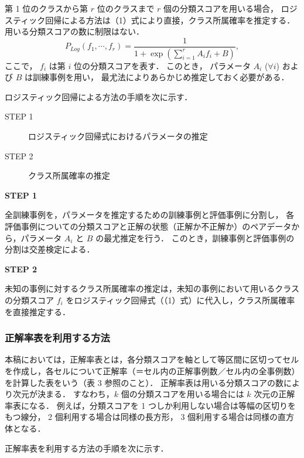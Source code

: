 \documentclass[japanese]{jnlp_1.4}
\begin{document}
第 1 位のクラスから第 $r$ 位のクラスまで $r$ 個の分類スコアを用いる場合，
ロジスティック回帰による方法は（1）式により直接，クラス所属確率を推定する．
用いる分類スコアの数に制限はない．
\begin{equation}
P_{Log}( f_{1},\cdots , f_{r} ) = \frac{1}{1+\exp (\sum_{i=1}^r A_{i}f_{i}+B)},
\end{equation}
ここで，
$f_{i}$ は第 $i$ 位の分類スコアを表す．
このとき，
パラメータ $A_{i}$ ($\forall i$) および $B$ は訓練事例を用い，
最尤法によりあらかじめ推定しておく必要がある．

ロジスティック回帰による方法の手順を次に示す．
\vspace{0.5\baselineskip}
\begin{description}
\item[STEP 1]
ロジスティック回帰式におけるパラメータの推定

\item[STEP 2]
クラス所属確率の推定
\end{description}
\vspace{0.5\baselineskip}
\noindent
{\bf STEP 1}
\par
全訓練事例を，パラメータを推定するための訓練事例と評価事例に分割し，
各評価事例についての分類スコアと正解の状態（正解か不正解か）のペアデータから，パラメータ $A_{i}$ と $B$ の最尤推定を行う．
このとき，訓練事例と評価事例の分割は交差検定による．
\vspace{1\baselineskip}\par
\noindent
{\bf STEP 2}

未知の事例に対するクラス所属確率の推定は，未知の事例において用いるクラスの分類スコア $f_{i}$ をロジスティック回帰式（（1）式）に代入し，クラス所属確率を直接推定する．


\subsubsection{正解率表を利用する方法}

本稿においては，正解率表とは，各分類スコアを軸として等区間に区切ってセルを作成し，各セルについて正解率（＝セル内の正解事例数／セル内の全事例数）を計算した表をいう（表 3 参照のこと）．
正解率表は用いる分類スコアの数により次元が決まる．
すなわち，$k$ 個の分類スコアを用いる場合には $k$ 次元の正解率表になる．
例えば，分類スコアを 1 つしか利用しない場合は等幅の区切りをもつ線分，
2 個利用する場合は同様の長方形，
3 個利用する場合は同様の直方体となる．

正解率表を利用する方法の手順を次に示す．\\
\end{document}

